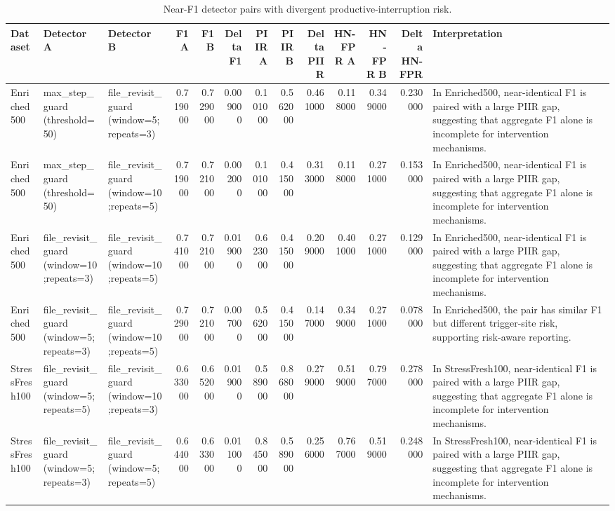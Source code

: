\begin{table}
\caption{Near-F1 detector pairs with divergent productive-interruption risk.}
\label{tab:table4_near_f1_risk_divergence}
\begin{tabular}{lllrrrrrrrrrl}
\toprule
Dataset & Detector A & Detector B & F1 A & F1 B & Delta F1 & PIIR A & PIIR B & Delta PIIR & HN-FPR A & HN-FPR B & Delta HN-FPR & Interpretation \\
\midrule
Enriched500 & max\_step\_guard (threshold=50) & file\_revisit\_guard (window=5;repeats=3) & 0.719000 & 0.729000 & 0.009000 & 0.101000 & 0.562000 & 0.461000 & 0.118000 & 0.349000 & 0.230000 & In Enriched500, near-identical F1 is paired with a large PIIR gap, suggesting that aggregate F1 alone is incomplete for intervention mechanisms. \\
Enriched500 & max\_step\_guard (threshold=50) & file\_revisit\_guard (window=10;repeats=5) & 0.719000 & 0.721000 & 0.002000 & 0.101000 & 0.415000 & 0.313000 & 0.118000 & 0.271000 & 0.153000 & In Enriched500, near-identical F1 is paired with a large PIIR gap, suggesting that aggregate F1 alone is incomplete for intervention mechanisms. \\
Enriched500 & file\_revisit\_guard (window=10;repeats=3) & file\_revisit\_guard (window=10;repeats=5) & 0.741000 & 0.721000 & 0.019000 & 0.623000 & 0.415000 & 0.209000 & 0.401000 & 0.271000 & 0.129000 & In Enriched500, near-identical F1 is paired with a large PIIR gap, suggesting that aggregate F1 alone is incomplete for intervention mechanisms. \\
Enriched500 & file\_revisit\_guard (window=5;repeats=3) & file\_revisit\_guard (window=10;repeats=5) & 0.729000 & 0.721000 & 0.007000 & 0.562000 & 0.415000 & 0.147000 & 0.349000 & 0.271000 & 0.078000 & In Enriched500, the pair has similar F1 but different trigger-site risk, supporting risk-aware reporting. \\
StressFresh100 & file\_revisit\_guard (window=5;repeats=5) & file\_revisit\_guard (window=10;repeats=3) & 0.633000 & 0.652000 & 0.019000 & 0.589000 & 0.868000 & 0.279000 & 0.519000 & 0.797000 & 0.278000 & In StressFresh100, near-identical F1 is paired with a large PIIR gap, suggesting that aggregate F1 alone is incomplete for intervention mechanisms. \\
StressFresh100 & file\_revisit\_guard (window=5;repeats=3) & file\_revisit\_guard (window=5;repeats=5) & 0.644000 & 0.633000 & 0.011000 & 0.845000 & 0.589000 & 0.256000 & 0.767000 & 0.519000 & 0.248000 & In StressFresh100, near-identical F1 is paired with a large PIIR gap, suggesting that aggregate F1 alone is incomplete for intervention mechanisms. \\

\end{tabular}
\end{table}
